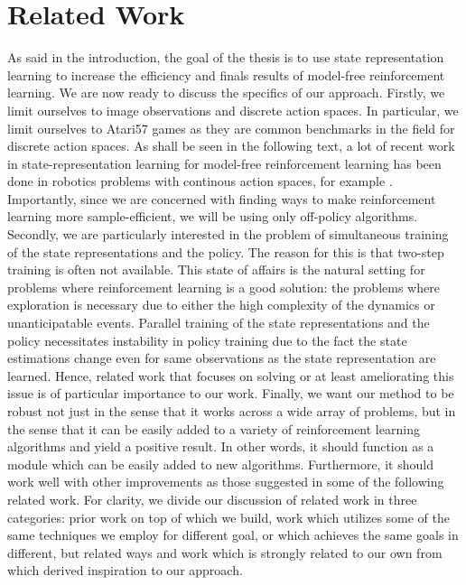 \chapter{Related Work}
As said in the introduction, the goal of the thesis is to use
state representation learning to increase the efficiency 
and finals results of model-free reinforcement learning.
We are now ready to discuss the specifics of our approach.
Firstly, we limit ourselves to image observations and discrete action spaces.
In particular, we limit ourselves to Atari57 games as they are common benchmarks in the field
for discrete action spaces.
As shall be seen in the following text, a lot of recent work in state-representation learning
for model-free reinforcement learning has been done in robotics problems with 
continous action spaces, for example \cite{sac+ae}. %
Importantly, since we are concerned with finding ways to make  reinforcement learning
more sample-efficient, we will be using only off-policy algorithms.
Secondly, we are particularly interested in the problem of simultaneous training
of the state representations and the policy.
The reason for this is that two-step training is often not available.
This state of affairs is the natural setting for problems where reinforcement learning
is a good solution: the problems where exploration is necessary due to
either the high complexity of the dynamics or unanticipatable events.
Parallel training of the state representations and the policy necessitates
instability in policy training due to the fact the state estimations
change even for same observations as the state representation are learned.
Hence, related work that focuses on solving or at least ameliorating this issue 
is of particular importance to our work.
Finally, we want our method to be robust not just in the sense that it works
across a wide array of problems, but in the sense that it can be 
easily added to a variety of reinforcement learning algorithms
and yield a positive result. In other words, it should function as a module
which can be easily added to new algorithms.
Furthermore, it should work well with other improvements as those suggested
in some of the following related work.
For clarity, we divide our discussion of related work in three categories:
prior work on top of which we build, work which utilizes some of the same
techniques we employ for different goal, or which achieves the same goals
in different, but related ways and work which is strongly related to our own
from which derived inspiration to our approach.

